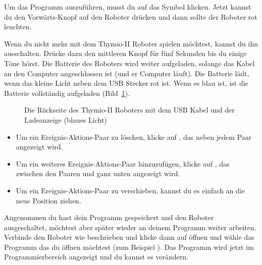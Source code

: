 
Um das Programm auszuführen, musst du auf das Symbol  klicken. Jetzt
kannst du den Vorwärts-Knopf auf den Roboter drücken und dann sollte der
Roboter rot leuchten.


Wenn du nicht mehr mit dem Thymio-II Roboter spielen möchtest, kannst du ihn
ausschalten. Drücke dazu den mittleren Knopf für fünf Sekunden bis du einige
Töne hörst. Die Batterie des Roboters wird weiter aufgeladen, solange das Kabel
an den Computer angeschlossen ist (und er Computer läuft). Die Batterie lädt,
wenn das kleine Licht neben dem USB Stecker rot ist. Wenn es blau ist, ist die
Batterie vollständig aufgeladen (Bild~\ref{fig.back}).

\begin{figure}
\begin{center}
\caption{Die Rückseite des Thymio-II Roboters mit dem USB Kabel und der
Ladeanzeige (blaues Licht)}\label{fig.back}
\end{center}
\end{figure}


\begin{itemize}
\item Um ein Ereignis-Aktions-Paar zu löschen, klicke auf , das neben
    jedem Paar angezeigt wird.
\item Um ein weiteres Ereignis-Aktions-Paar hinzuzufügen, klicke auf
    , das zwischen den Paaren und ganz unten angezeigt wird.
\item Um ein Ereignis-Aktions-Paar zu verschieben, kannst du es einfach an die
    neue Position ziehen.
\end{itemize}


Angenommen du hast dein Programm gespeichert und den Roboter ausgeschaltet,
möchtest aber später wieder an deinem Programm weiter arbeiten. Verbinde den
Roboter wie beschrieben und klicke dann auf öffnen  und wähle das
Programm das du öffnen möchtest (zum Beispiel ). Das Programm
wird jetzt im Programmierbereich angezeigt und du kannst es verändern.


